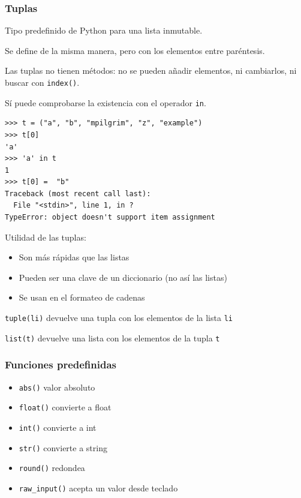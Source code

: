 \documentclass{beamer}
\begin{document}
\begin{frame}[fragile]
\frametitle{Tuplas}

Tipo predefinido de Python para una lista inmutable.

Se define de la misma manera, pero con los elementos entre paréntesis.

Las tuplas no tienen métodos: no se pueden añadir elementos, ni
cambiarlos, ni buscar con \verb|index()|.

Sí puede comprobarse la existencia con el operador \verb|in|.


\begin{footnotesize}
\begin{verbatim}
>>> t = ("a", "b", "mpilgrim", "z", "example") 
>>> t[0]                                       
'a'
>>> 'a' in t
1
>>> t[0] =  "b"
Traceback (most recent call last):
  File "<stdin>", line 1, in ?
TypeError: object doesn't support item assignment
\end{verbatim}
\end{footnotesize}

  
\end{frame}



\begin{frame}[fragile]

Utilidad de las tuplas:
\begin{itemize}
\item Son más rápidas que las listas
\item Pueden ser una clave de un diccionario (no así las listas)
\item Se usan en el formateo de cadenas
\end{itemize} 

\verb|tuple(li)| devuelve una tupla con los elementos de la lista \verb|li|

\verb|list(t)| devuelve una lista con los elementos de la tupla \verb|t|

\end{frame} 





\begin{frame}[fragile]
\frametitle{Funciones predefinidas}  
\begin{itemize}
  
\item 
\verb|abs()|   valor absoluto
\item 
\verb|float()|  convierte a float
\item 
\verb|int()|  convierte a int
\item 
\verb|str()|  convierte a string
\item 
\verb|round()|  redondea
\item 
\verb|raw_input()|  acepta un valor desde teclado


\end{itemize}
\end{frame}
\end{document}
